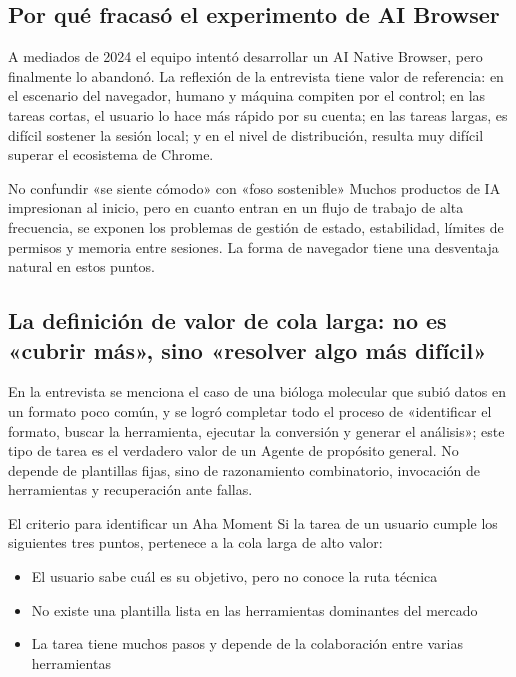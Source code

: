 \documentclass[a4paper]{article}
\begin{document}
\subsection{Por qué fracasó el experimento de AI Browser}

A mediados de 2024 el equipo intentó desarrollar un AI Native Browser, pero finalmente lo abandonó. La reflexión de la entrevista tiene valor de referencia: en el escenario del navegador, humano y máquina compiten por el control; en las tareas cortas, el usuario lo hace más rápido por su cuenta; en las tareas largas, es difícil sostener la sesión local; y en el nivel de distribución, resulta muy difícil superar el ecosistema de Chrome.

\begin{warningbox}{No confundir «se siente cómodo» con «foso sostenible»}
Muchos productos de IA impresionan al inicio, pero en cuanto entran en un flujo de trabajo de alta frecuencia, se exponen los problemas de gestión de estado, estabilidad, límites de permisos y memoria entre sesiones. La forma de navegador tiene una desventaja natural en estos puntos.
\end{warningbox}

\subsection{La definición de valor de cola larga: no es «cubrir más», sino «resolver algo más difícil»}

En la entrevista se menciona el caso de una bióloga molecular que subió datos en un formato poco común, y se logró completar todo el proceso de «identificar el formato, buscar la herramienta, ejecutar la conversión y generar el análisis»; este tipo de tarea es el verdadero valor de un Agente de propósito general. No depende de plantillas fijas, sino de razonamiento combinatorio, invocación de herramientas y recuperación ante fallas.

\begin{importantbox}{El criterio para identificar un Aha Moment}
Si la tarea de un usuario cumple los siguientes tres puntos, pertenece a la cola larga de alto valor:
\begin{itemize}
    \item El usuario sabe cuál es su objetivo, pero no conoce la ruta técnica
    \item No existe una plantilla lista en las herramientas dominantes del mercado
    \item La tarea tiene muchos pasos y depende de la colaboración entre varias herramientas
\end{itemize}
\end{importantbox}
\end{document}
